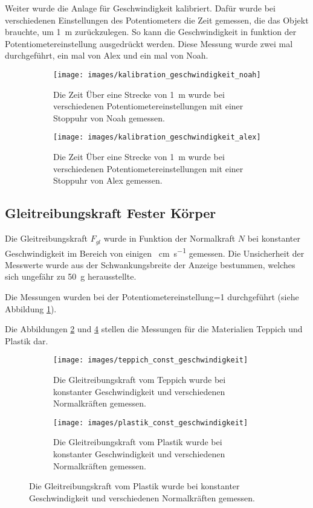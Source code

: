 Weiter wurde die Anlage  f\"ur  Geschwindigkeit  kalibriert.  Daf\"ur  wurde bei
verschiedenen Einstellungen des Potentiometers die Zeit gemessen, die das Objekt
brauchte,  um  \SI{1}{\meter} zur\"uckzulegen. So kann  die  Geschwindigkeit  in
funktion der Potentiometereinstellung ausgedr\"uckt werden. Diese Messung  wurde
zwei mal durchgef\"uhrt, ein mal von Alex und ein mal von Noah.

\begin{figure}[H]
    \centering
    \begin{subfigure}{.7\textwidth}
        \texttt{[image: images/kalibration\_geschwindigkeit\_noah]}
        \caption{Die Zeit \"Uber eine Strecke von \SI{1}{\meter} wurde bei verschiedenen Potentiometereinstellungen mit einer Stoppuhr von Noah gemessen.}
    \end{subfigure}
    \begin{subfigure}{.7\textwidth}
        \texttt{[image: images/kalibration\_geschwindigkeit\_alex]}
        \caption{Die Zeit \"Uber eine Strecke von \SI{1}{\meter} wurde bei verschiedenen Potentiometereinstellungen mit einer Stoppuhr von Alex gemessen.}
    \end{subfigure}
    \caption{}\label{fig:kalibration_geschwindigkeit}
\end{figure}


\subsection{Gleitreibungskraft Fester K\"orper}

Die  Gleitreibungskraft  $F_{gl}$  wurde  in  Funktion der Normalkraft  $N$  bei
konstanter Geschwindigkeit im Bereich von einigen \SI{}{\centi\meter\per\second}
gemessen. Die Unsicherheit der Messwerte wurde  aus  der  Schwankungsbreite  der
Anzeige  bestummen, welches sich  ungef\"ahr  zu  \SI{50}{\gram}  herausstellte.

Die  Messungen  wurden bei der Potentiometereinstellung=1 durchgef\"uhrt  (siehe
Abbildung \ref{fig:kalibration_geschwindigkeit}).

Die        Abbildungen        \ref{fig:teppich_const_geschwindigkeit}        und
\ref{fig:plastik_const_geschwindigkeit}  stellen   die   Messungen   f\"ur   die
Materialien Teppich und Plastik dar.

\begin{figure}[H]
    \centering
    \begin{subfigure}{.7\textwidth}
        \texttt{[image: images/teppich\_const\_geschwindigkeit]}
        \caption{Die Gleitreibungskraft vom Teppich wurde bei konstanter Geschwindigkeit und verschiedenen Normalkr\"aften gemessen.}
        \label{fig:teppich_const_geschwindigkeit}
    \end{subfigure}
    \begin{subfigure}{.7\textwidth}
        \texttt{[image: images/plastik\_const\_geschwindigkeit]}
        \caption{Die Gleitreibungskraft vom Plastik wurde bei konstanter Geschwindigkeit und verschiedenen Normalkr\"aften gemessen.}
        \label{fig:plastik_const_geschwindigkeit}
    \end{subfigure}
\end{figure}

